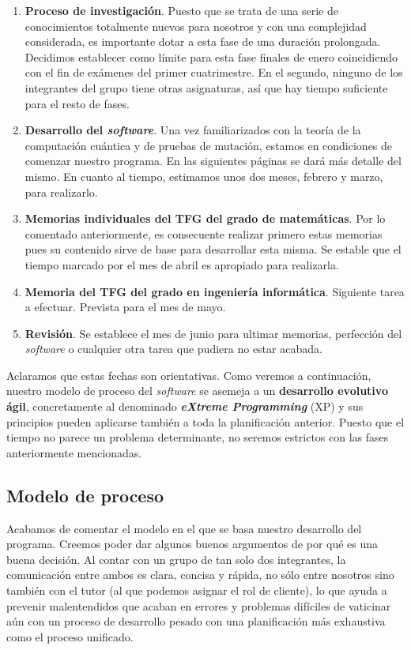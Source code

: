 \begin{enumerate}
\item \textbf{Proceso de investigación}. Puesto que se trata de una serie de conocimientos totalmente nuevos para nosotros y con una complejidad considerada, es importante dotar a esta fase de una duración prolongada. Decidimos establecer como límite para esta fase finales de enero coincidiendo con el fin de exámenes del primer cuatrimestre. En el segundo, ninguno de los integrantes del grupo tiene otras asignaturas, así que hay tiempo suficiente para el resto de fases.
\item \textbf{Desarrollo del \textit{software}}. Una vez familiarizados con la teoría de la computación cuántica y de pruebas de mutación, estamos en condiciones de comenzar nuestro programa. En las siguientes páginas se dará más detalle del mismo. En cuanto al tiempo, estimamos unos dos meses, febrero y marzo, para realizarlo.
\item \textbf{Memorias individuales del TFG del grado de matemáticas}. Por lo comentado anteriormente, es consecuente realizar primero estas memorias pues su contenido sirve de base para desarrollar esta misma. Se estable que el tiempo marcado por el mes de abril es apropiado para realizarla.
\item \textbf{Memoria del TFG del grado en ingeniería informática}. Siguiente tarea a efectuar. Prevista para el mes de mayo.
\item \textbf{Revisión}. Se establece el mes de junio para ultimar memorias, perfección del \textit{software} o cualquier otra tarea que pudiera no estar acabada.
\end{enumerate}

Aclaramos que estas fechas son orientativas. Como veremos a continuación, nuestro modelo de proceso del \textit{software} se asemeja a un \textbf{desarrollo evolutivo ágil}, concretamente al denominado \textbf{\textit{eXtreme Programming}} (XP) y sus principios pueden aplicarse también a toda la planificación anterior. Puesto que el tiempo no parece un problema determinante, no seremos estrictos con las fases anteriormente mencionadas.

\subsection{Modelo de proceso}

Acabamos de comentar el modelo en el que se basa nuestro desarrollo del programa. Creemos poder dar algunos buenos argumentos de por qué es una buena decisión. Al contar con un grupo de tan solo dos integrantes, la comunicación entre ambos es clara, concisa y rápida, no sólo entre nosotros sino también con el tutor (al que podemos asignar el rol de cliente), lo que ayuda a prevenir malentendidos que acaban en errores y problemas difíciles de vaticinar aún con un proceso de desarrollo pesado con una planificación más exhaustiva como el proceso unificado.

